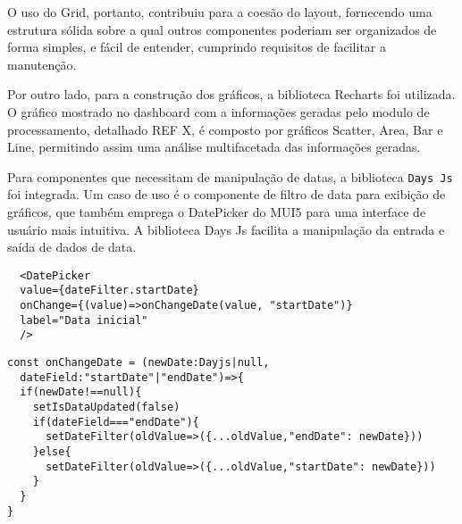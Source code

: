 O uso do Grid, portanto, contribuiu para a coesão do layout, fornecendo uma estrutura sólida sobre a qual outros componentes poderiam ser organizados de forma simples, e fácil de entender, cumprindo requisitos de facilitar a manutenção.%

Por outro lado, para a construção dos gráficos, a biblioteca Recharts foi utilizada. O gráfico mostrado no dashboard com a informações geradas pelo modulo de processamento, detalhado REF X, é composto por gráficos Scatter, Area, Bar e Line, permitindo assim uma análise multifacetada das informações geradas. 

Para componentes que necessitam de manipulação de datas, a biblioteca \texttt{Days Js} \cite{dayJsInstallation} foi integrada. Um caso de uso é o componente de filtro de data para exibição de gráficos, que também emprega o DatePicker \cite{muiDatePickerValidation} do \gls{MUI5} para uma interface de usuário mais intuitiva. A biblioteca Days Js facilita a manipulação da entrada e saída de dados de data.

\begin{verbatim}
  <DatePicker
  value={dateFilter.startDate}
  onChange={(value)=>onChangeDate(value, "startDate")}
  label="Data inicial"
  />
\end{verbatim}

\begin{verbatim}
const onChangeDate = (newDate:Dayjs|null, 
  dateField:"startDate"|"endDate")=>{
  if(newDate!==null){
    setIsDataUpdated(false)
    if(dateField==="endDate"){
      setDateFilter(oldValue=>({...oldValue,"endDate": newDate}))
    }else{
      setDateFilter(oldValue=>({...oldValue,"startDate": newDate}))
    }
  }
}
\end{verbatim}


